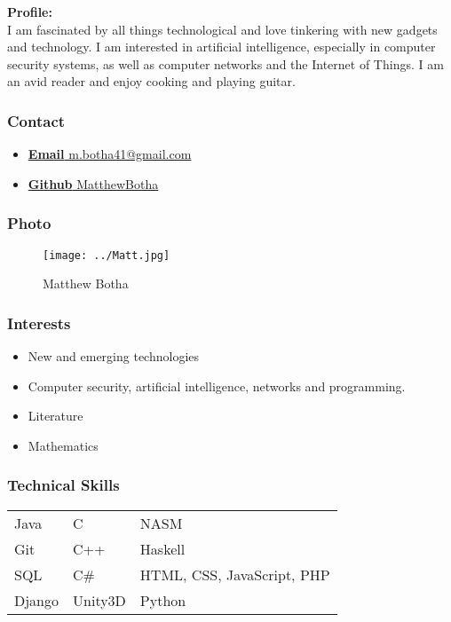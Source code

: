 		\textbf{Profile:}\\
		I am fascinated by all things technological and love tinkering with new gadgets and technology. I am interested in artificial intelligence, especially in computer security systems, as well as computer networks and the Internet of Things. I am an avid reader and enjoy cooking and playing guitar.
		\subsubsection{Contact}
			\begin{itemize}
				\item \href{mailto:m.botha41@gmail.com}{\textbf{Email} m.botha41@gmail.com}
				\item \href{https://github.com/MatthewBotha}{\textbf{Github} MatthewBotha}
			\end{itemize}
		\subsubsection{Photo}
		\begin{figure}[H]
			\centering
			\texttt{[image: ../Matt.jpg]}
			\caption{Matthew Botha}
		\end{figure}
		\subsubsection{Interests}
		\begin{itemize}
			\item New and emerging technologies
			\item Computer security, artificial intelligence, networks and programming.
			\item Literature
			\item Mathematics
		\end{itemize}
		
\subsubsection{Technical Skills}
			\begin{tabular}{| l | l | l |}
				Java   & C		& NASM                        \\
				Git    & C++      & Haskell                     \\
				SQL    & C\#	& HTML, CSS, JavaScript, PHP   \\
				Django & Unity3D	& Python	
			\end{tabular}
		
